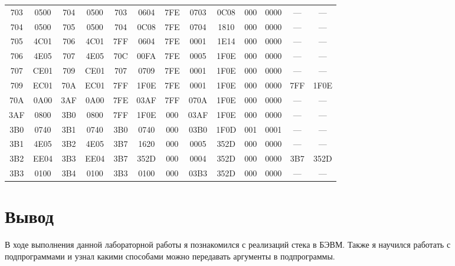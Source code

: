 \begin{flushleft}
\begin{tabular}{|c|c|c|c|c|c|c|c|c|c|c|c|c|}
		703 & 0500 & 704 & 0500 & 703 & 0604 & 7FE & 0703 & 0C08 & 000 & 0000 & --- & ---	\\

		704 & 0500 & 705 & 0500 & 704 & 0C08 & 7FE & 0704 & 1810 & 000 & 0000 & --- & ---	\\

		705 & 4C01 & 706 & 4C01 & 7FF & 0604 & 7FE & 0001 & 1E14 & 000 & 0000 & --- & ---	\\

		706 & 4E05 & 707 & 4E05 & 70C & 00FA & 7FE & 0005 & 1F0E & 000 & 0000 & --- & ---	\\

		707 & CE01 & 709 & CE01 & 707 & 0709 & 7FE & 0001 & 1F0E & 000 & 0000 & --- & ---	\\

		709 & EC01 & 70A & EC01 & 7FF & 1F0E & 7FE & 0001 & 1F0E & 000 & 0000 & 7FF & 1F0E	\\

		70A & 0A00 & 3AF & 0A00 & 7FE & 03AF & 7FF & 070A & 1F0E & 000 & 0000 & --- & ---	\\
		\hline
		3AF & 0800 & 3B0 & 0800 & 7FF & 1F0E & 000 & 03AF & 1F0E & 000 & 0000 & --- & ---	\\

		3B0 & 0740 & 3B1 & 0740 & 3B0 & 0740 & 000 & 03B0 & 1F0D & 001 & 0001 & --- & ---	\\

		3B1 & 4E05 & 3B2 & 4E05 & 3B7 & 1620 & 000 & 0005 & 352D & 000 & 0000 & --- & ---	\\

		3B2 & EE04 & 3B3 & EE04 & 3B7 & 352D & 000 & 0004 & 352D & 000 & 0000 & 3B7 & 352D	\\
		\hline
		3B3 & 0100 & 3B4 & 0100 & 3B3 & 0100 & 000 & 03B3 & 352D & 000 & 0000 & --- & ---	\\
		\hline
	\end{tabular}
\end{flushleft}
\newpage

\section{Вывод}
\noindent В ходе выполнения данной лабораторной работы я познакомился с реализаций стека в БЭВМ. Также я научился работать с подпрограммами и узнал какими способами можно передавать аргументы в подпрограммы.